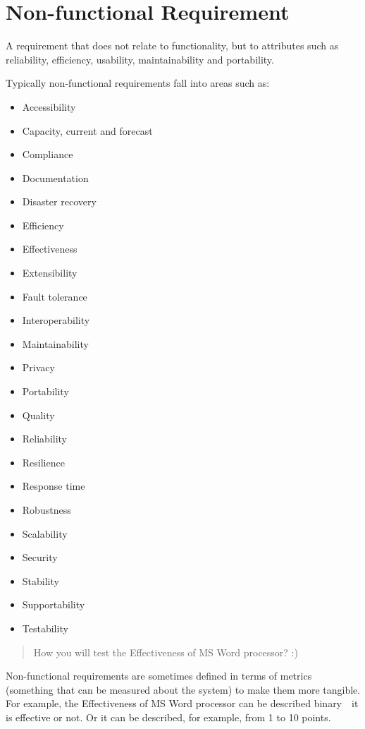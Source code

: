 \section{Non-functional Requirement}
\label{sec:Non-functional Requirement}

A requirement that does not relate to functionality, but to attributes such as reliability, efficiency, usability, maintainability and portability.

Typically non-functional requirements fall into areas such as:
\begin{itemize}
\item 
Accessibility
\item     Capacity, current and forecast
   \item  Compliance
    \item Documentation
  \item   Disaster recovery
    \item Efficiency
    \item Effectiveness
    \item Extensibility
   \item  Fault tolerance
    \item Interoperability
   \item  Maintainability
   \item  Privacy
   \item  Portability
   \item  Quality
  \item   Reliability
   \item  Resilience
   \item  Response time
    \item Robustness
   \item  Scalability
  \item   Security
   \item  Stability
  \item   Supportability
   \item  Testability 
   \end{itemize}

\begin{quote}
How you will test the Effectiveness of MS Word processor? :)
\end{quote} 

Non-functional requirements are sometimes defined in terms of metrics (something that can be measured about the system) to make them more tangible. For example, the Effectiveness of MS Word processor can be described binary~\textemdash~it is effective or not. Or it can be described, for example, from 1 to 10 points.

